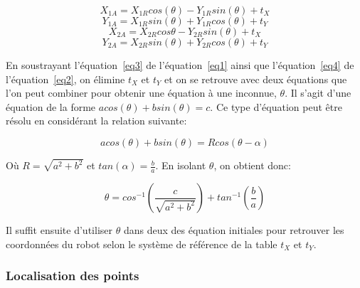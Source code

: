 \begin{equation}
\label{eq1}
X_{1A} = X_{1R}cos(\theta) - Y_{1R}sin(\theta) + t_X
\end{equation}
\begin{equation}
\label{eq2}
Y_{1A} = X_{1R}sin(\theta) + Y_{1R}cos(\theta) + t_Y
\end{equation}
\begin{equation}
\label{eq3}
X_{2A} = X_{2R}cos{\theta} - Y_{2R}sin(\theta) + t_X
\end{equation}
\begin{equation}
\label{eq4}
Y_{2A} = X_{2R}sin(\theta) + Y_{2R}cos(\theta) + t_Y
\end{equation}

En soustrayant l'équation~\ref{eq3} de l'équation~\ref{eq1} ainsi que l'équation~\ref{eq4} de l'équation~\ref{eq2}, on élimine $t_X$ et $t_Y$ et on se retrouve avec deux équations que l'on peut combiner pour obtenir une équation à une inconnue, $\theta$. Il s'agit d'une équation de la forme $a cos(\theta) + b sin(\theta) = c$. Ce type d'équation peut être résolu en considérant la relation suivante:

\begin{equation}
a cos(\theta) + b sin(\theta) = R cos(\theta - \alpha)
\end{equation}

Où $R = \sqrt{a^2 + b^2}$ et $tan(\alpha) = \frac{b}{a}$. En isolant $\theta$, on obtient donc:

\begin{equation}
\theta = cos^{-1}(\frac{c}{\sqrt{a^2 + b^2}}) + tan^{-1}(\frac{b}{a})
\end{equation} 

Il suffit ensuite d'utiliser $\theta$ dans deux des équation initiales pour retrouver les coordonnées du robot selon le système de référence de la table $t_X$ et $t_Y$.

\subsubsection{Localisation des points}

